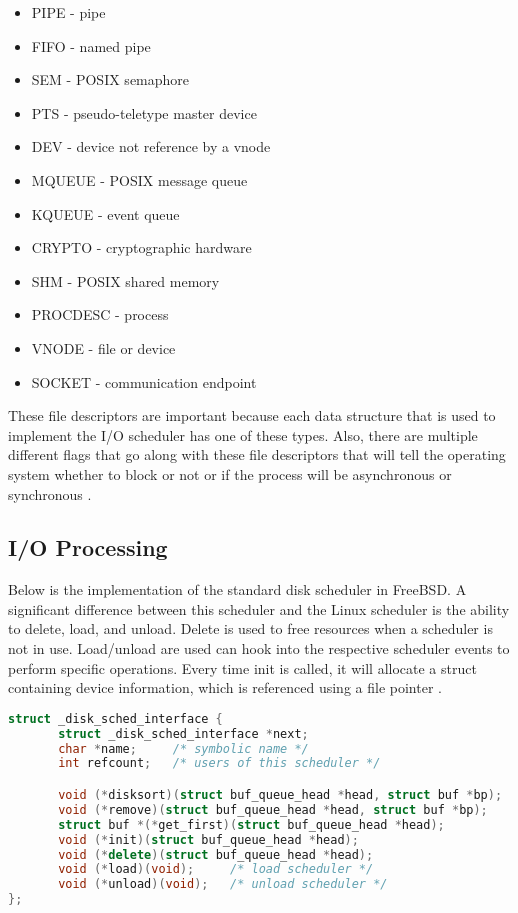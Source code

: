 \documentclass[letterpaper,draftclsnofoot,10pt,onecolumn,titlepage]{IEEEtran}\usepackage[margin=0.75in]{geometry}
\begin{document}
\begin{itemize}
\item  PIPE - pipe
\item  FIFO - named pipe
\item  SEM - POSIX semaphore
\item  PTS - pseudo-teletype master device
\item  DEV - device not reference by a vnode
\item  MQUEUE - POSIX message queue
\item  KQUEUE - event queue
\item  CRYPTO - cryptographic hardware
\item  SHM - POSIX shared memory
\item  PROCDESC - process
\item  VNODE - file or device
\item  SOCKET - communication endpoint
\end{itemize}

These file descriptors are important because each data structure that is used to implement the 
I/O scheduler has one of these types. Also, there are multiple different flags that go along 
with these file descriptors that will tell the operating system whether to block or not or if 
the process will be asynchronous or synchronous \cite{FreeBSDBook}.

\subsection{I/O Processing}
Below is the implementation of the standard disk scheduler in FreeBSD. A significant difference between 
this scheduler and the Linux scheduler is the ability to delete, load, and unload. Delete is used to free
resources when a scheduler is not in use. Load/unload are used can hook into the respective scheduler events
to perform specific operations. Every time init is called, it will allocate a struct containing device 
information, which is referenced using a file pointer \cite{FreeBSDBook}.

\begin{lstlisting}[language=C++]
struct _disk_sched_interface {
       struct _disk_sched_interface *next;
       char *name;     /* symbolic name */
       int refcount;   /* users of this scheduler */

       void (*disksort)(struct buf_queue_head *head, struct buf *bp);
       void (*remove)(struct buf_queue_head *head, struct buf *bp);
       struct buf *(*get_first)(struct buf_queue_head *head);
       void (*init)(struct buf_queue_head *head);
       void (*delete)(struct buf_queue_head *head);
       void (*load)(void);     /* load scheduler */
       void (*unload)(void);   /* unload scheduler */
};
\end{lstlisting}\cite{freebsd}
\end{document}
